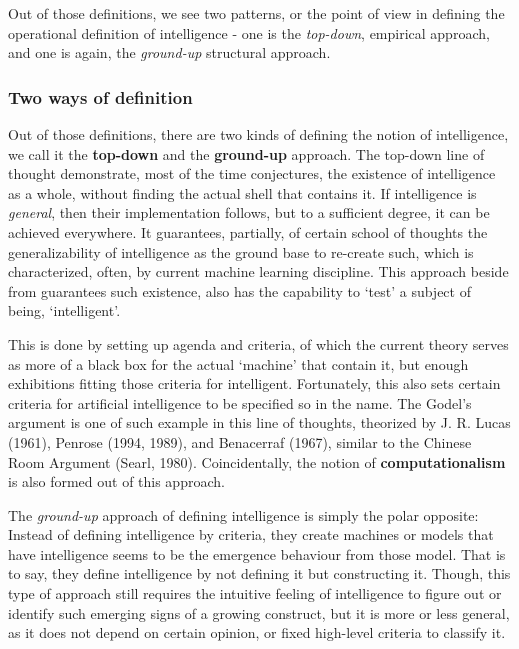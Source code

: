Out of those definitions, we see two patterns, or the point of view in defining the operational definition of intelligence - one is the \textit{top-down}, empirical approach, and one is again, the \textit{ground-up} structural approach. 

\subsubsection{Two ways of definition}
Out of those definitions, there are two kinds of defining the notion of intelligence, we call it the \textbf{top-down} and the \textbf{ground-up} approach. The top-down line of thought demonstrate, most of the time conjectures, the existence of intelligence as a whole, without finding the actual shell that contains it. If intelligence is \textit{general}, then their implementation follows, but to a sufficient degree, it can be achieved everywhere. It guarantees, partially, of certain school of thoughts the generalizability of intelligence as the ground base to re-create such, which is characterized, often, by current machine learning discipline. This approach beside from guarantees such existence, also has the capability to `test' a subject of being, `intelligent'. 
\vspace{2mm}

This is done by setting up agenda and criteria, of which the current theory serves as more of a black box for the actual `machine' that contain it, but enough exhibitions fitting those criteria for intelligent. Fortunately, this also sets certain criteria for artificial intelligence to be specified so in the name. The Godel's argument is one of such example in this line of thoughts, theorized by J. R. Lucas (1961), Penrose (1994, 1989), and Benacerraf (1967), similar to the Chinese Room Argument (Searl, 1980). Coincidentally, the notion of \textbf{computationalism} is also formed out of this approach. 
\vspace{2mm}

The \textit{ground-up} approach of defining intelligence is simply the polar opposite: Instead of defining intelligence by criteria, they create machines or models that have intelligence seems to be the emergence behaviour from those model. That is to say, they define intelligence by not defining it but constructing it. Though, this type of approach still requires the intuitive feeling of intelligence to figure out or identify such emerging signs of a growing construct, but it is more or less general, as it does not depend on certain opinion, or fixed high-level criteria to classify it. 

